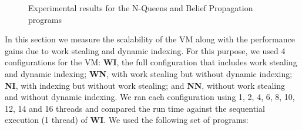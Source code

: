 \documentclass{sigplanconf}
\begin{document}
\begin{figure}[ht]
\centering
{}
\hspace{0.5cm}
\caption{Experimental results for the N-Queens and Belief Propagation programs}
\end{figure}

In this section we measure the scalability of the VM along with the
performance gains due to work stealing and dynamic indexing.  For
this purpose, we used 4 configurations for the VM: \textbf{WI}, the
full configuration that includes work stealing and dynamic indexing;
\textbf{WN}, with work stealing but without dynamic
indexing; \textbf{NI}, with indexing but without work stealing; and
\textbf{NN}, without work stealing and without dynamic indexing.  We
ran each configuration using 1, 2, 4, 6, 8, 10, 12, 14 and 16 threads
and compared the run time against the sequential execution (1 thread)
of \textbf{WI}. We used the following set of programs:
\end{document}
